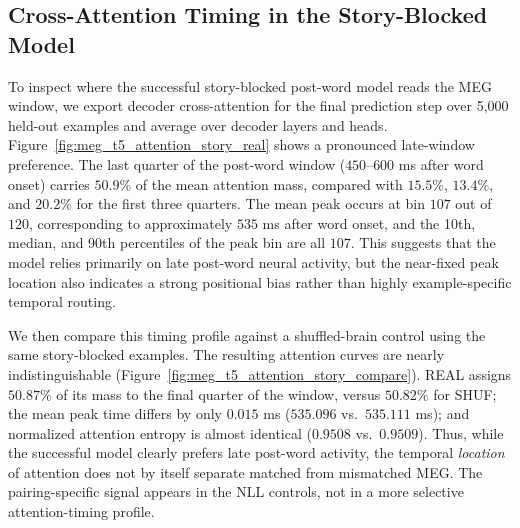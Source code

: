 \documentclass{article}
\theoremstyle{plain}
\theoremstyle{definition}
\theoremstyle{remark}
\begin{document}
\begin{table}[h]
\centering
\caption{
Story-blocked temporal ablation for the post-word hybrid MEG-MASC/T5 model.
The full $0.0$--$0.6$ s window is strongest; the early half is effectively null, the late half retains only a weaker effect, and a narrow late slice fails.
}
\label{tab:meg_t5_appendix_windows}
\end{table}

\subsection{Cross-Attention Timing in the Story-Blocked Model}
\label{app:meg_t5_attention}

To inspect where the successful story-blocked post-word model reads the MEG window, we export decoder cross-attention for the final prediction step over 5{,}000 held-out examples and average over decoder layers and heads.
Figure~\ref{fig:meg_t5_attention_story_real} shows a pronounced late-window preference.
The last quarter of the post-word window ($450$--$600$ ms after word onset) carries $50.9\%$ of the mean attention mass, compared with $15.5\%$, $13.4\%$, and $20.2\%$ for the first three quarters.
The mean peak occurs at bin $107$ out of $120$, corresponding to approximately $535$ ms after word onset, and the 10th, median, and 90th percentiles of the peak bin are all $107$.
This suggests that the model relies primarily on late post-word neural activity, but the near-fixed peak location also indicates a strong positional bias rather than highly example-specific temporal routing.

We then compare this timing profile against a shuffled-brain control using the same story-blocked examples.
The resulting attention curves are nearly indistinguishable (Figure~\ref{fig:meg_t5_attention_story_compare}).
REAL assigns $50.87\%$ of its mass to the final quarter of the window, versus $50.82\%$ for SHUF; the mean peak time differs by only $0.015$ ms ($535.096$ vs.\ $535.111$ ms); and normalized attention entropy is almost identical ($0.9508$ vs.\ $0.9509$).
Thus, while the successful model clearly prefers late post-word activity, the temporal \emph{location} of attention does not by itself separate matched from mismatched MEG.
The pairing-specific signal appears in the NLL controls, not in a more selective attention-timing profile.
\end{document}
